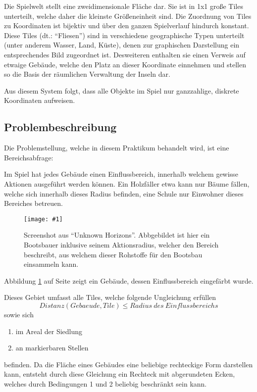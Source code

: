\documentclass[%
			fontsize=12pt,%
			paper=a4,%
			DIV11,
			liststotoc,
			bibtotoc,
			draft=false,%
			titlepage
			]{scrartcl}
\newcommand{\myfig}[5] {
 \begin{figure}[tbph]
	 \centering
	 \texttt{[image: \#1]}
	 \caption[#4]{#5}
	 \label{fig:#2}
 \end{figure}
}
\begin{document}
Die Spielwelt stellt eine zweidimensionale Fläche dar.
Sie ist in 1x1 große Tiles unterteilt, welche daher die kleinste Größeneinheit sind. 
Die Zuordnung von Tiles zu Koordinaten ist bijektiv und über den ganzen Spielverlauf hindurch konstant.
Diese Tiles (dt.: "`Fliesen"') sind in verschiedene geographische Typen unterteilt (unter anderem Wasser, Land, Küste), denen zur graphischen Darstellung ein entsprechendes Bild zugeordnet ist. Desweiteren enthalten sie einen Verweis auf etwaige Gebäude, welche den Platz an dieser Koordinate einnehmen und stellen so die Basis der räumlichen Verwaltung der Inseln dar.

Aus diesem System folgt, dass alle Objekte im Spiel nur ganzzahlige, diskrete Koordinaten aufweisen.


\subsection{Problembeschreibung}
Die Problemstellung, welche in diesem Praktikum behandelt wird, ist eine Bereichsabfrage:

Im Spiel hat jedes Gebäude einen Einflussbereich, innerhalb welchem gewisse Aktionen ausgeführt werden können.
Ein Holzfäller etwa kann nur Bäume fällen, welche sich innerhalb dieses Radius befinden,
eine Schule nur Einwohner dieses Bereiches betreuen.
\myfig{img/uh-boatbuilder-overview}{boatbuilder}{width=.8\textwidth}
{Screenshot aus "`Unknown Horizons"'}
{Screenshot aus "`Unknown Horizons"'. Abbgebildet ist hier ein Bootsbauer inklusive seinem Aktionsradius, welcher den Bereich beschreibt, aus welchem dieser Rohstoffe für den Bootsbau einsammeln kann.}
Abbildung \ref{fig:boatbuilder} auf Seite \pageref{fig:boatbuilder} zeigt ein Gebäude, dessen Einflussbereich eingefärbt wurde.

Dieses Gebiet umfasst alle Tiles, welche folgende Ungleichung erfüllen
\begin{equation}
	Distanz(Gebaeude, Tile) \leq Radius\ des\ Einflussbereichs
\end{equation}
sowie sich
\begin{enumerate}
	\item im Areal der Siedlung 
	\item an markierbaren Stellen
\end{enumerate}
befinden.
Da die Fläche eines Gebäudes eine beliebige rechteckige Form darstellen kann, entsteht durch diese Gleichung ein Rechteck mit abgerundeten Ecken, welches durch Bedingungen 1 und 2 beliebig beschränkt sein kann.
\end{document}
